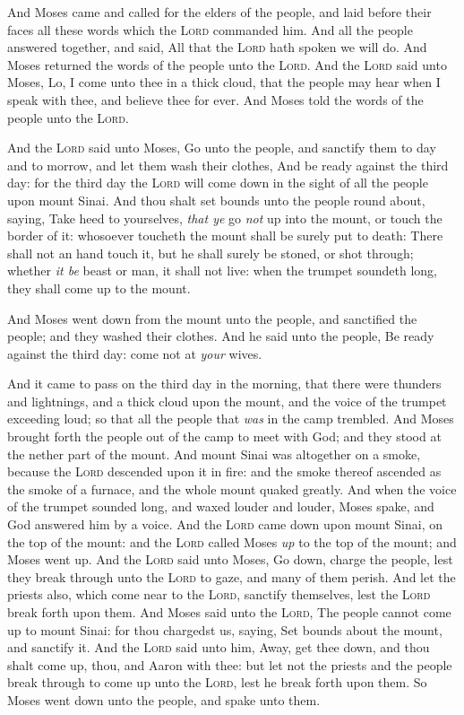 \documentclass[11pt,letterpaper,oneside]{memoir}
\begin{document}
And Moses came and called for the elders of the people, and laid before
their faces all these words which the \textsc{Lord} commanded him. And
all the people answered together, and said, All that the \textsc{Lord}
hath spoken we will do. And Moses returned the words of the people unto
the \textsc{Lord}. And the \textsc{Lord} said unto Moses, Lo, I come
unto thee in a thick cloud, that the people may hear when I speak with
thee, and believe thee for ever. And Moses told the words of the people
unto the \textsc{Lord}.

And the \textsc{Lord} said unto Moses, Go unto the people, and sanctify
them to day and to morrow, and let them wash their clothes, And be ready
against the third day: for the third day the \textsc{Lord} will come
down in the sight of all the people upon mount Sinai. And thou shalt set
bounds unto the people round about, saying, Take heed to yourselves,
\emph{that ye} go \emph{not} up into the mount, or touch the border of
it: whosoever toucheth the mount shall be surely put to death: There
shall not an hand touch it, but he shall surely be stoned, or shot
through; whether \emph{it be} beast or man, it shall not live: when the
trumpet soundeth long, they shall come up to the mount.

And Moses went down from the mount unto the people, and sanctified the
people; and they washed their clothes. And he said unto the people, Be
ready against the third day: come not at \emph{your} wives.

And it came to pass on the third day in the morning, that there were
thunders and lightnings, and a thick cloud upon the mount, and the voice
of the trumpet exceeding loud; so that all the people that \emph{was} in
the camp trembled. And Moses brought forth the people out of the camp to
meet with God; and they stood at the nether part of the mount. And mount
Sinai was altogether on a smoke, because the \textsc{Lord} descended
upon it in fire: and the smoke thereof ascended as the smoke of a
furnace, and the whole mount quaked greatly. And when the voice of the
trumpet sounded long, and waxed louder and louder, Moses spake, and God
answered him by a voice. And the \textsc{Lord} came down upon mount
Sinai, on the top of the mount: and the \textsc{Lord} called Moses
\emph{up} to the top of the mount; and Moses went up. And the
\textsc{Lord} said unto Moses, Go down, charge the people, lest they
break through unto the \textsc{Lord} to gaze, and many of them perish.
And let the priests also, which come near to the \textsc{Lord}, sanctify
themselves, lest the \textsc{Lord} break forth upon them. And Moses said
unto the \textsc{Lord}, The people cannot come up to mount Sinai: for
thou chargedst us, saying, Set bounds about the mount, and sanctify it.
And the \textsc{Lord} said unto him, Away, get thee down, and thou shalt
come up, thou, and Aaron with thee: but let not the priests and the
people break through to come up unto the \textsc{Lord}, lest he break
forth upon them. So Moses went down unto the people, and spake unto
them.
\end{document}
